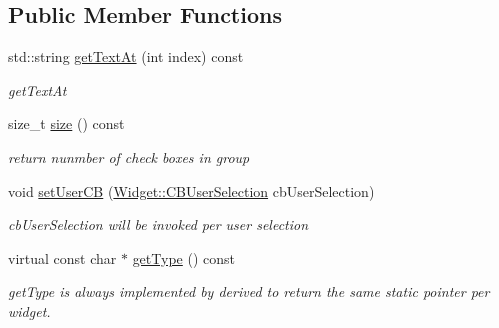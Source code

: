 \subsection*{Public Member Functions}
\begin{DoxyCompactItemize}
\item 
std\+::string \hyperlink{classcanvascv_1_1SelectionBox_adb7793b6a0508af80e6320f87549a99e}{get\+Text\+At} (int index) const 
\begin{DoxyCompactList}\small\item\em get\+Text\+At \end{DoxyCompactList}\item 
size\+\_\+t \hyperlink{classcanvascv_1_1SelectionBox_aa24538ddb8d188e7db4c052ba2cf0728}{size} () const \hypertarget{classcanvascv_1_1SelectionBox_aa24538ddb8d188e7db4c052ba2cf0728}{}\label{classcanvascv_1_1SelectionBox_aa24538ddb8d188e7db4c052ba2cf0728}

\begin{DoxyCompactList}\small\item\em return nunmber of check boxes in group \end{DoxyCompactList}\item 
void \hyperlink{classcanvascv_1_1SelectionBox_a760cb57780d64eee6dda96b2971ea3af}{set\+User\+CB} (\hyperlink{classcanvascv_1_1Widget_a977cbd39cf203c5866f07f3645c7e4bc}{Widget\+::\+C\+B\+User\+Selection} cb\+User\+Selection)\hypertarget{classcanvascv_1_1SelectionBox_a760cb57780d64eee6dda96b2971ea3af}{}\label{classcanvascv_1_1SelectionBox_a760cb57780d64eee6dda96b2971ea3af}

\begin{DoxyCompactList}\small\item\em cb\+User\+Selection will be invoked per user selection \end{DoxyCompactList}\item 
virtual const char $\ast$ \hyperlink{classcanvascv_1_1SelectionBox_aef13ee1ea2023ccb5589b6328b458e1c}{get\+Type} () const 
\begin{DoxyCompactList}\small\item\em get\+Type is always implemented by derived to return the same static pointer per widget. \end{DoxyCompactList}\end{DoxyCompactItemize}
